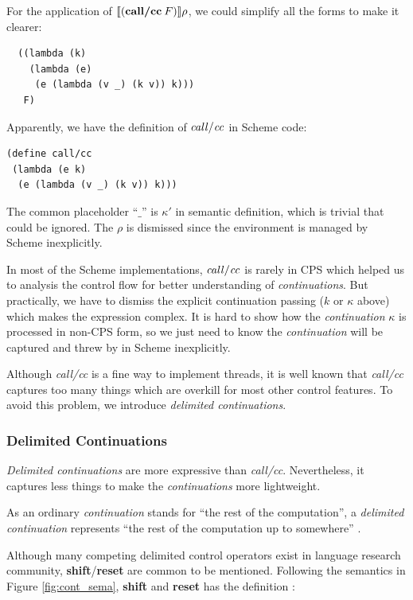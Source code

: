 \documentclass[numbers,numberedpars]{sigplanconf}
\begin{document}
For the application of $\llbracket{(\text{{\bf call/cc}}\:F)}\rrbracket\rho$, we could simplify all the forms to make it clearer:
\begin{lstlisting}
  ((lambda (k)
    (lambda (e)
     (e (lambda (v _) (k v)) k)))
   F)
\end{lstlisting}

Apparently, we have the definition of ${\it call/cc}$ in Scheme code:
\begin{lstlisting}
(define call/cc
 (lambda (e k)
  (e (lambda (v _) (k v)) k)))
\end{lstlisting}

The common placeholder  ``$\_$'' is $\kappa'$ in semantic definition, which is trivial that could be ignored.
The $\rho$ is dismissed since the environment is managed by Scheme inexplicitly.

In most of the Scheme implementations, ${\it call/cc}$ is rarely in CPS which helped us to analysis the control flow for better understanding
of {\it continuations}.
But practically, we have to dismiss the explicit continuation passing ($k$ or $\kappa$ above) which makes the expression complex.
It is hard to show how the {\it continuation} $\kappa$ is processed in non-CPS form, so we just need to know the {\it continuation} will be captured and
threw by in Scheme inexplicitly.

Although {\it call/cc} is a fine way to implement threads, it is well known that {\it call/cc} captures too many things which are overkill for most
other control features. To avoid this problem, we introduce {\it delimited continuations}.

\subsubsection{Delimited Continuations} \label{Delimited Continuations}

{\it Delimited continuations} are more expressive than {\it call/cc}.
Nevertheless, it captures less things to make the {\it continuations} more lightweight.

As an ordinary {\it continuation} stands for ``the rest of the computation'', a {\it delimited continuation} represents
``the rest of the computation up to somewhere'' \citep{sumii2000implementation}.

Although many competing delimited control operators exist in language research community, {\bf shift}/{\bf reset} are common to be mentioned. 
Following the semantics in Figure \ref{fig:cont_sema}, {\bf shift} and {\bf reset} has the definition \citep{Danvy92representingcontrol:}:
\end{document}

